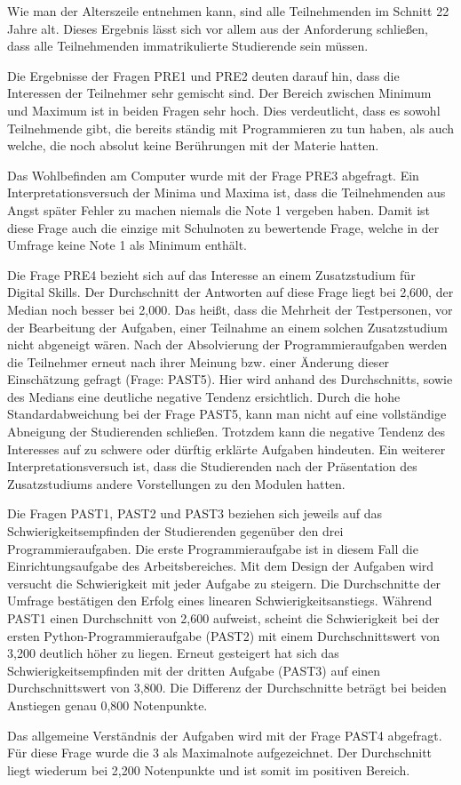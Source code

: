 Wie man der Alterszeile entnehmen kann, sind alle Teilnehmenden im Schnitt 22
Jahre alt. Dieses Ergebnis lässt sich vor allem aus der Anforderung schließen,
dass alle Teilnehmenden immatrikulierte Studierende sein müssen.

Die Ergebnisse der Fragen PRE1 und PRE2 deuten darauf hin, dass die Interessen
der Teilnehmer sehr gemischt sind. Der Bereich zwischen Minimum und Maximum ist
in beiden Fragen sehr hoch. Dies verdeutlicht, dass es sowohl Teilnehmende gibt,
die bereits ständig mit Programmieren zu tun haben, als auch welche, die noch
absolut keine Berührungen mit der Materie hatten.

Das Wohlbefinden am Computer wurde mit der Frage PRE3 abgefragt. Ein
Interpretationsversuch der Minima und Maxima ist, dass die Teilnehmenden aus
Angst später Fehler zu machen niemals die Note 1 vergeben haben. Damit ist diese
Frage auch die einzige mit Schulnoten zu bewertende Frage, welche in der Umfrage
keine Note 1 als Minimum enthält.

Die Frage PRE4 bezieht sich auf das Interesse an einem Zusatzstudium für
Digital Skills. Der Durchschnitt der Antworten auf diese Frage liegt bei 2,600,
der Median noch besser bei 2,000. Das heißt, dass die Mehrheit der Testpersonen,
vor der Bearbeitung der Aufgaben, einer Teilnahme an einem solchen Zusatzstudium
nicht abgeneigt wären. Nach der Absolvierung der Programmieraufgaben werden die 
Teilnehmer erneut nach ihrer Meinung bzw. einer Änderung dieser Einschätzung
gefragt (Frage: PAST5). Hier wird anhand des Durchschnitts, sowie des Medians
eine deutliche negative Tendenz ersichtlich. Durch die hohe Standardabweichung
bei der Frage PAST5, kann man nicht auf eine vollständige Abneigung der
Studierenden schließen. Trotzdem kann die negative Tendenz des Interesses auf zu
schwere oder dürftig erklärte Aufgaben hindeuten. Ein weiterer
Interpretationsversuch ist, dass die Studierenden nach der Präsentation des 
Zusatzstudiums andere Vorstellungen zu den Modulen hatten.

Die Fragen PAST1, PAST2 und PAST3 beziehen sich jeweils auf das
Schwierigkeitsempfinden der Studierenden gegenüber den drei Programmieraufgaben.
Die erste Programmieraufgabe ist in diesem Fall die Einrichtungsaufgabe des
Arbeitsbereiches. Mit dem Design der Aufgaben wird versucht die Schwierigkeit
mit jeder Aufgabe zu steigern. Die Durchschnitte der Umfrage bestätigen den
Erfolg eines linearen Schwierigkeitsanstiegs. Während PAST1 einen Durchschnitt
von 2,600 aufweist, scheint die Schwierigkeit bei der ersten
Python-Programmieraufgabe (PAST2) mit einem Durchschnittswert von 3,200 deutlich
höher zu liegen. Erneut gesteigert hat sich das Schwierigkeitsempfinden mit der
dritten Aufgabe (PAST3) auf einen Durchschnittswert von 3,800. Die Differenz der
Durchschnitte beträgt bei beiden Anstiegen genau 0,800 Notenpunkte.

Das allgemeine Verständnis der Aufgaben wird mit der Frage PAST4 abgefragt. Für
diese Frage wurde die 3 als Maximalnote aufgezeichnet. Der Durchschnitt liegt
wiederum bei 2,200 Notenpunkte und ist somit im positiven Bereich.